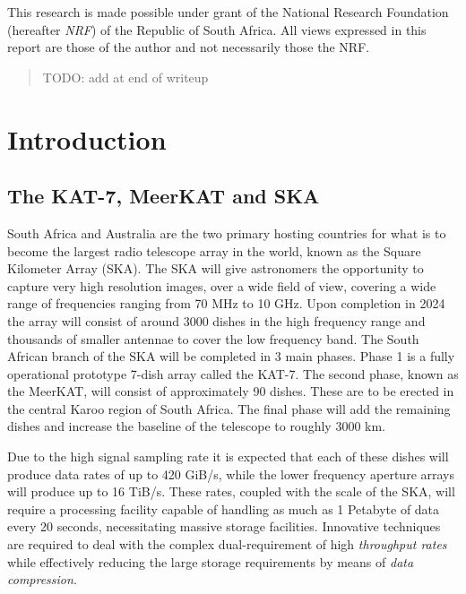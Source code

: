 This research is made possible under grant of the National Research Foundation (hereafter \textit{NRF}) of the Republic of South Africa. All views expressed in this report are those of the author and not 
necessarily those the NRF.
\pagebreak
\begin{abstract}
 {\color{red}TODO: add at end of writeup}
\end{abstract}
\pagebreak
\tableofcontents
\pagebreak
\section{Introduction}
\subsection{The KAT-7, MeerKAT and SKA}
South Africa and Australia are the two primary hosting countries for what is to become the largest radio telescope array in the world, known as the Square Kilometer Array (SKA). 
The SKA will give astronomers the opportunity to capture very high resolution images, over a wide field of view, covering a wide range of frequencies ranging 
from 70 MHz to 10 GHz. Upon completion in 2024 the array will consist of around 3000 dishes in the high frequency range and thousands of smaller antennae to 
cover the low frequency band. The South African branch of the SKA will be completed in 3 main phases. Phase 1 is a fully operational prototype 7-dish array 
called the KAT-7. The second phase, known as the MeerKAT, will consist of approximately 90 dishes. These are to be erected in the central Karoo region of South Africa. 
The final phase will add the remaining dishes and increase the baseline of the telescope to roughly 3000 km.

Due to the high signal sampling rate it is expected that each of these dishes will produce data rates of up to 420 GiB/s, while the lower frequency aperture arrays 
will produce up to 16 TiB/s. These rates, coupled with the scale of the SKA, will require a processing facility capable of handling as much as 1 Petabyte of 
data every 20 seconds, necessitating massive storage facilities. Innovative techniques are required to deal with the complex dual-requirement of high 
\textit{throughput rates} while effectively reducing the large storage requirements by means of \textit{data compression}. 
